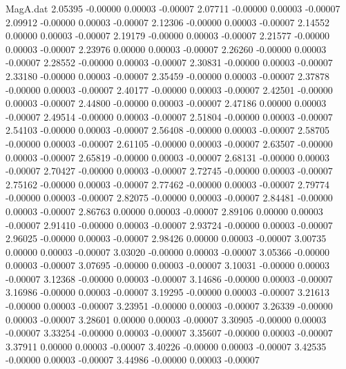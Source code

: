 \begin{filecontents}{MagA.dat}
   2.05395   -0.00000    0.00003   -0.00007
   2.07711   -0.00000    0.00003   -0.00007
   2.09912   -0.00000    0.00003   -0.00007
   2.12306   -0.00000    0.00003   -0.00007
   2.14552    0.00000    0.00003   -0.00007
   2.19179   -0.00000    0.00003   -0.00007
   2.21577   -0.00000    0.00003   -0.00007
   2.23976    0.00000    0.00003   -0.00007
   2.26260   -0.00000    0.00003   -0.00007
   2.28552   -0.00000    0.00003   -0.00007
   2.30831   -0.00000    0.00003   -0.00007
   2.33180   -0.00000    0.00003   -0.00007
   2.35459   -0.00000    0.00003   -0.00007
   2.37878   -0.00000    0.00003   -0.00007
   2.40177   -0.00000    0.00003   -0.00007
   2.42501   -0.00000    0.00003   -0.00007
   2.44800   -0.00000    0.00003   -0.00007
   2.47186    0.00000    0.00003   -0.00007
   2.49514   -0.00000    0.00003   -0.00007
   2.51804   -0.00000    0.00003   -0.00007
   2.54103   -0.00000    0.00003   -0.00007
   2.56408   -0.00000    0.00003   -0.00007
   2.58705   -0.00000    0.00003   -0.00007
   2.61105   -0.00000    0.00003   -0.00007
   2.63507   -0.00000    0.00003   -0.00007
   2.65819   -0.00000    0.00003   -0.00007
   2.68131   -0.00000    0.00003   -0.00007
   2.70427   -0.00000    0.00003   -0.00007
   2.72745   -0.00000    0.00003   -0.00007
   2.75162   -0.00000    0.00003   -0.00007
   2.77462   -0.00000    0.00003   -0.00007
   2.79774   -0.00000    0.00003   -0.00007
   2.82075   -0.00000    0.00003   -0.00007
   2.84481   -0.00000    0.00003   -0.00007
   2.86763    0.00000    0.00003   -0.00007
   2.89106    0.00000    0.00003   -0.00007
   2.91410   -0.00000    0.00003   -0.00007
   2.93724   -0.00000    0.00003   -0.00007
   2.96025   -0.00000    0.00003   -0.00007
   2.98426    0.00000    0.00003   -0.00007
   3.00735    0.00000    0.00003   -0.00007
   3.03020   -0.00000    0.00003   -0.00007
   3.05366   -0.00000    0.00003   -0.00007
   3.07695   -0.00000    0.00003   -0.00007
   3.10031   -0.00000    0.00003   -0.00007
   3.12368   -0.00000    0.00003   -0.00007
   3.14686   -0.00000    0.00003   -0.00007
   3.16986   -0.00000    0.00003   -0.00007
   3.19295   -0.00000    0.00003   -0.00007
   3.21613   -0.00000    0.00003   -0.00007
   3.23951   -0.00000    0.00003   -0.00007
   3.26339   -0.00000    0.00003   -0.00007
   3.28601    0.00000    0.00003   -0.00007
   3.30905   -0.00000    0.00003   -0.00007
   3.33254   -0.00000    0.00003   -0.00007
   3.35607   -0.00000    0.00003   -0.00007
   3.37911    0.00000    0.00003   -0.00007
   3.40226   -0.00000    0.00003   -0.00007
   3.42535   -0.00000    0.00003   -0.00007
   3.44986   -0.00000    0.00003   -0.00007

\end{filecontents}

